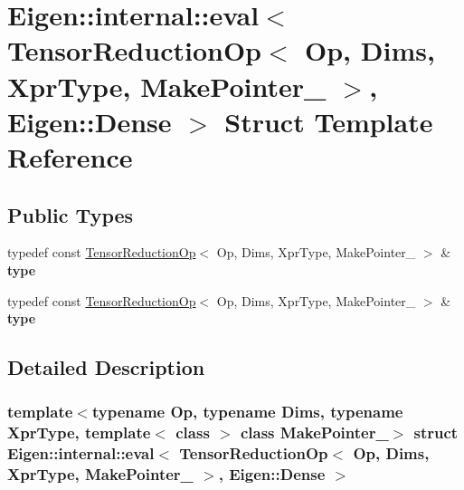 \hypertarget{struct_eigen_1_1internal_1_1eval_3_01_tensor_reduction_op_3_01_op_00_01_dims_00_01_xpr_type_00_00c091111a76ab7a3f6cf062dd12dd3c4}{}\section{Eigen\+:\+:internal\+:\+:eval$<$ Tensor\+Reduction\+Op$<$ Op, Dims, Xpr\+Type, Make\+Pointer\+\_\+ $>$, Eigen\+:\+:Dense $>$ Struct Template Reference}
\label{struct_eigen_1_1internal_1_1eval_3_01_tensor_reduction_op_3_01_op_00_01_dims_00_01_xpr_type_00_00c091111a76ab7a3f6cf062dd12dd3c4}
\subsection*{Public Types}
\begin{DoxyCompactItemize}
\item 
\mbox{\label{struct_eigen_1_1internal_1_1eval_3_01_tensor_reduction_op_3_01_op_00_01_dims_00_01_xpr_type_00_00c091111a76ab7a3f6cf062dd12dd3c4_a32b65e36873e4dbea8a1eadbe13f3e09}} 
typedef const \hyperlink{class_eigen_1_1_tensor_reduction_op}{Tensor\+Reduction\+Op}$<$ Op, Dims, Xpr\+Type, Make\+Pointer\+\_\+ $>$ \& {\bfseries type}
\item 
\mbox{\label{struct_eigen_1_1internal_1_1eval_3_01_tensor_reduction_op_3_01_op_00_01_dims_00_01_xpr_type_00_00c091111a76ab7a3f6cf062dd12dd3c4_a32b65e36873e4dbea8a1eadbe13f3e09}} 
typedef const \hyperlink{class_eigen_1_1_tensor_reduction_op}{Tensor\+Reduction\+Op}$<$ Op, Dims, Xpr\+Type, Make\+Pointer\+\_\+ $>$ \& {\bfseries type}
\end{DoxyCompactItemize}


\subsection{Detailed Description}
\subsubsection*{template$<$typename Op, typename Dims, typename Xpr\+Type, template$<$ class $>$ class Make\+Pointer\+\_\+$>$\newline
struct Eigen\+::internal\+::eval$<$ Tensor\+Reduction\+Op$<$ Op, Dims, Xpr\+Type, Make\+Pointer\+\_\+ $>$, Eigen\+::\+Dense $>$}



